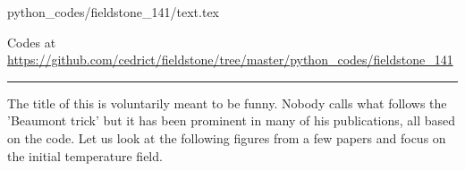 \begin{flushright} {\tiny {\color{gray} python\_codes/fieldstone\_141/text.tex}} \end{flushright}



\begin{center}
Codes at \url{https://github.com/cedrict/fieldstone/tree/master/python_codes/fieldstone_141}
\end{center}

\par\noindent\rule{\textwidth}{0.4pt}




The title of this \stone is voluntarily meant to be funny. 
Nobody calls what follows the 'Beaumont trick' but it has been 
prominent in many of his publications, all based on the \sopale code.
Let us look at the following figures from a few papers and focus on the 
initial temperature field.

